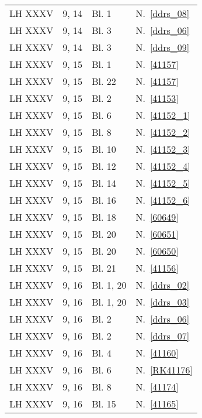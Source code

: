 \begin{longtable}{llll}
\footnotesize
%
LH XXXV & 9, 14 & Bl. 1\textendash 2 & N.~\ref{ddrs_08}\\
LH XXXV & 9, 14 & Bl. 3 & N.~\ref{ddrs_06}\\
LH XXXV & 9, 14 & Bl. 3 & N.~\ref{ddrs_09}\\
%
LH XXXV & 9, 15 & Bl. 1 & N.~\ref{41157}\\
LH XXXV & 9, 15 & Bl. 22 & N.~\ref{41157}\\
LH XXXV & 9, 15 & Bl. 2\textendash 5 & N.~\ref{41153}\\
LH XXXV & 9, 15 & Bl. 6\textendash 7 & N.~\ref{41152_1}\\
LH XXXV & 9, 15 & Bl. 8\textendash 9 & N.~\ref{41152_2}\\
LH XXXV & 9, 15 & Bl. 10\textendash 11 & N.~\ref{41152_3}\\
LH XXXV & 9, 15 & Bl. 12\textendash 13 & N.~\ref{41152_4}\\
LH XXXV & 9, 15 & Bl. 14\textendash 15 & N.~\ref{41152_5}\\
LH XXXV & 9, 15 & Bl. 16\textendash 17 & N.~\ref{41152_6}\\
LH XXXV & 9, 15 & Bl. 18\textendash 19 & N.~\ref{60649}\\
LH XXXV & 9, 15 & Bl. 20 & N.~\ref{60651}\\
LH XXXV & 9, 15 & Bl. 20 & N.~\ref{60650}\\
LH XXXV & 9, 15 & Bl. 21 & N.~\ref{41156}\\
%
LH XXXV & 9, 16 & Bl. 1, 20 & N.~\ref{ddrs_02}\\
LH XXXV & 9, 16 & Bl. 1, 20 & N.~\ref{ddrs_03}\\
LH XXXV & 9, 16 & Bl. 2\textendash 3 & N.~\ref{ddrs_06}\\
LH XXXV & 9, 16 & Bl. 2\textendash 3 & N.~\ref{ddrs_07}\\
LH XXXV & 9, 16 & Bl. 4 & N.~\ref{41160}\\
LH XXXV & 9, 16 & Bl. 6 & N.~\ref{RK41176}\\
LH XXXV & 9, 16 & Bl. 8 & N.~\ref{41174}\\
LH XXXV & 9, 16 & Bl. 15 & N.~\ref{41165}\\

\end{longtable}
